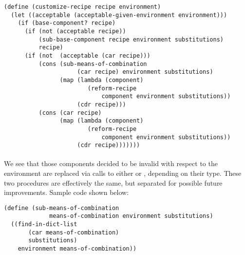 \begin{verbatim}
(define (customize-recipe recipe environment)
  (let ((acceptable (acceptable-given-environment environment)))
    (if (base-component? recipe)
      (if (not (acceptable recipe))
          (sub-base-component recipe environment substitutions)
          recipe)
      (if (not  (acceptable (car recipe)))
          (cons (sub-means-of-combination
                     (car recipe) environment substitutions)
                (map (lambda (component)
                        (reform-recipe
                            component environment substitutions))
                     (cdr recipe)))
          (cons (car recipe)
                (map (lambda (component)
                        (reform-recipe
                            component environment substitutions))
                     (cdr recipe)))))))
\end{verbatim}
\paragraph{}
We see that those components decided to be invalid with respect to the environment are replaced via calls to either  or , depending on their type. These two procedures are effectively the same, but separated for possible future improvements. Sample code shown below:

\begin{verbatim}
(define (sub-means-of-combination
             means-of-combination environment substitutions)
  ((find-in-dict-list
       (car means-of-combination)
       substitutions)
    environment means-of-combination))
\end{verbatim}

